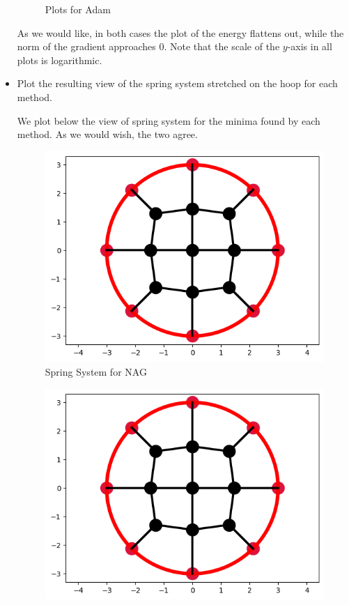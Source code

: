 \documentclass{../kin_math}
\begin{document}
\begin{questions}
\begin{itemize}
\begin{solution}
\begin{figure}
        \caption{Plots for Adam}
      \end{figure}
      As we would like, in both cases the plot of the energy flattens out, while the norm of the gradient approaches 0. Note that the scale of the $y$-axis in all plots is logarithmic.
    \end{solution}
    \item Plot the resulting view of the spring system stretched on the hoop for each method.
    \begin{solution}
      We plot below the view of spring system for the minima found by each method. As we would wish, the two agree.
      \begin{figure}
        \centering
        \includegraphics[scale=0.6]{nest_springs.png}
        \caption{Spring System for NAG}
      \end{figure}
      \begin{figure}
        \centering
        \includegraphics[scale=0.6]{adam_springs.png}

\end{figure}
\end{solution}
\end{itemize}
\end{questions}
\end{document}
